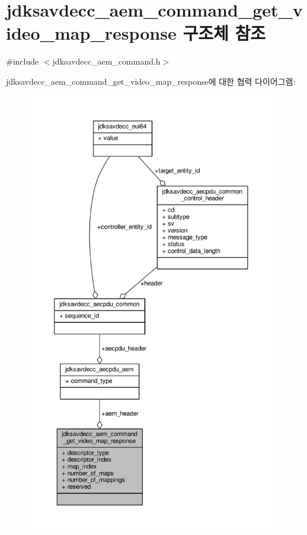 \hypertarget{structjdksavdecc__aem__command__get__video__map__response}{}\section{jdksavdecc\+\_\+aem\+\_\+command\+\_\+get\+\_\+video\+\_\+map\+\_\+response 구조체 참조}
\label{structjdksavdecc__aem__command__get__video__map__response}


{\ttfamily \#include $<$jdksavdecc\+\_\+aem\+\_\+command.\+h$>$}



jdksavdecc\+\_\+aem\+\_\+command\+\_\+get\+\_\+video\+\_\+map\+\_\+response에 대한 협력 다이어그램\+:
\nopagebreak
\begin{figure}[H]
\begin{center}
\leavevmode
\includegraphics[height=550pt]{structjdksavdecc__aem__command__get__video__map__response__coll__graph}
\end{center}
\end{figure}
